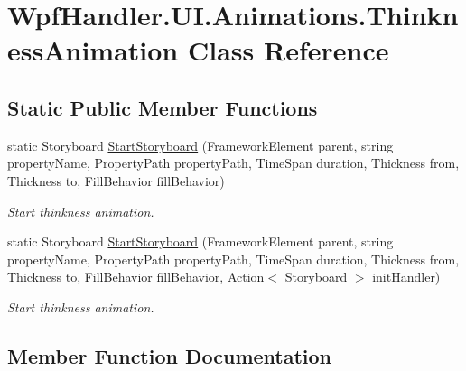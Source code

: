 \hypertarget{class_wpf_handler_1_1_u_i_1_1_animations_1_1_thinkness_animation}{}\section{Wpf\+Handler.\+U\+I.\+Animations.\+Thinkness\+Animation Class Reference}
\label{class_wpf_handler_1_1_u_i_1_1_animations_1_1_thinkness_animation}
\subsection*{Static Public Member Functions}
\begin{DoxyCompactItemize}
\item 
static Storyboard \mbox{\hyperlink{class_wpf_handler_1_1_u_i_1_1_animations_1_1_thinkness_animation_ac4a710434bb02a390f075779861718c3}{Start\+Storyboard}} (Framework\+Element parent, string property\+Name, Property\+Path property\+Path, Time\+Span duration, Thickness from, Thickness to, Fill\+Behavior fill\+Behavior)
\begin{DoxyCompactList}\small\item\em Start thinkness animation. \end{DoxyCompactList}\item 
static Storyboard \mbox{\hyperlink{class_wpf_handler_1_1_u_i_1_1_animations_1_1_thinkness_animation_a8d77a8dc5e24b4d00e9aa123a4ca7831}{Start\+Storyboard}} (Framework\+Element parent, string property\+Name, Property\+Path property\+Path, Time\+Span duration, Thickness from, Thickness to, Fill\+Behavior fill\+Behavior, Action$<$ Storyboard $>$ init\+Handler)
\begin{DoxyCompactList}\small\item\em Start thinkness animation. \end{DoxyCompactList}\end{DoxyCompactItemize}


\subsection{Member Function Documentation}
\mbox{\label{class_wpf_handler_1_1_u_i_1_1_animations_1_1_thinkness_animation_ac4a710434bb02a390f075779861718c3}} 
